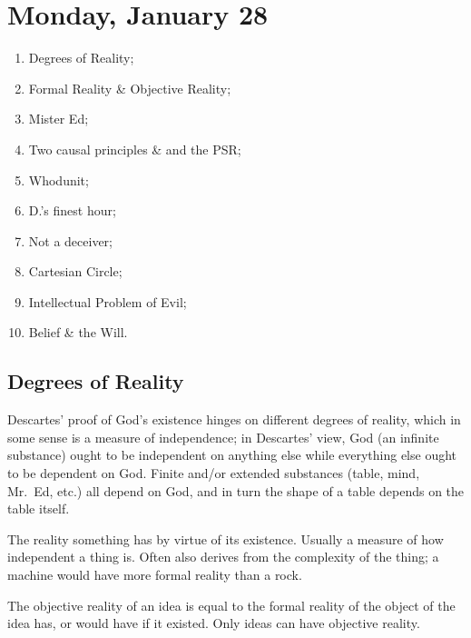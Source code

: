 
\section{Monday, January 28}

\begin{multicols}{2}
\begin{enumerate}
\item Degrees of Reality;
\item Formal Reality \& Objective Reality;
\item Mister Ed;
\item Two causal principles \& and the PSR;
\item Whodunit;
\item D.'s finest hour;
\item Not a deceiver;
\item Cartesian Circle;
\item Intellectual Problem of Evil;
\item Belief \& the Will.
\end{enumerate}
\end{multicols}

\subsection{Degrees of Reality}

Descartes' proof of God's existence hinges on different degrees of reality, which in some sense is a measure of independence; in Descartes' view, God (an infinite substance) ought to be independent on anything else while everything else ought to be dependent on God. Finite and/or extended substances (table, mind, Mr.\ Ed, etc.) all depend on God, and in turn the shape of a table depends on the table itself.

\begin{definition}
The reality something has by virtue of its existence. Usually a measure of how independent a thing is. Often also derives from the complexity of the thing; a machine would have more formal reality than a rock.
\end{definition}

\begin{definition}
The objective reality of an idea is equal to the formal reality of the object of the idea has, or would have if it existed. Only ideas can have objective reality.
\end{definition}

